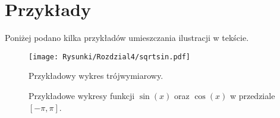 \section{Przykłady}
Poniżej podano kilka przykładów umieszczania ilustracji w tekście.
\begin{figure}[h!]
	\centering
		\texttt{[image: Rysunki/Rozdzial4/sqrtsin.pdf]}
		\label{fig:przyklad3D}
	\caption{Przykładowy wykres trójwymiarowy.}
\end{figure}
\newpage
\begin{figure}[h!]
  \centering
  \quad
  \caption{Przykładowe wykresy funkcji $\sin (x)$ oraz $\cos (x)$ w przedziale $[-\pi, \pi]$.}
  \label{fig:przyklad}
\end{figure}














